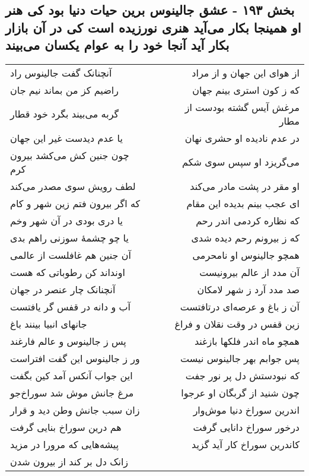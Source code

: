\begin{center}
\section*{بخش ۱۹۳ - عشق جالینوس برین حیات دنیا بود کی هنر او همینجا بکار می‌آید هنری نورزیده است کی در آن بازار بکار آید آنجا خود را به عوام یکسان می‌بیند}
\label{sec:sh193}
\begin{longtable}{l p{0.5cm} r}
آنچنانک گفت جالینوس راد
&&
از هوای این جهان و از مراد
\\
راضیم کز من بماند نیم جان
&&
که ز کون استری بینم جهان
\\
گربه می‌بیند بگرد خود قطار
&&
مرغش آیس گشته بودست از مطار
\\
یا عدم دیدست غیر این جهان
&&
در عدم نادیده او حشری نهان
\\
چون جنین کش می‌کشد بیرون کرم
&&
می‌گریزد او سپس سوی شکم
\\
لطف رویش سوی مصدر می‌کند
&&
او مقر در پشت مادر می‌کند
\\
که اگر بیرون فتم زین شهر و کام
&&
ای عجب بینم بدیده این مقام
\\
یا دری بودی در آن شهر وخم
&&
که نظاره کردمی اندر رحم
\\
یا چو چشمهٔ سوزنی راهم بدی
&&
که ز بیرونم رحم دیده شدی
\\
آن جنین هم غافلست از عالمی
&&
همچو جالینوس او نامحرمی
\\
اونداند کن رطوباتی که هست
&&
آن مدد از عالم بیرونیست
\\
آنچنانک چار عنصر در جهان
&&
صد مدد آرد ز شهر لامکان
\\
آب و دانه در قفس گر یافتست
&&
آن ز باغ و عرصه‌ای درتافتست
\\
جانهای انبیا بینند باغ
&&
زین قفس در وقت نقلان و فراغ
\\
پس ز جالینوس و عالم فارغند
&&
همچو ماه اندر فلکها بازغند
\\
ور ز جالینوس این گفت افتراست
&&
پس جوابم بهر جالینوس نیست
\\
این جواب آنکس آمد کین بگفت
&&
که نبودستش دل پر نور جفت
\\
مرغ جانش موش شد سوراخ‌جو
&&
چون شنید از گربگان او عرجوا
\\
زان سبب جانش وطن دید و قرار
&&
اندرین سوراخ دنیا موش‌وار
\\
هم درین سوراخ بنایی گرفت
&&
درخور سوراخ دانایی گرفت
\\
پیشه‌هایی که مرورا در مزید
&&
کاندرین سوراخ کار آید گزید
\\
زانک دل بر کند از بیرون شدن

\end{longtable}
\end{center}
